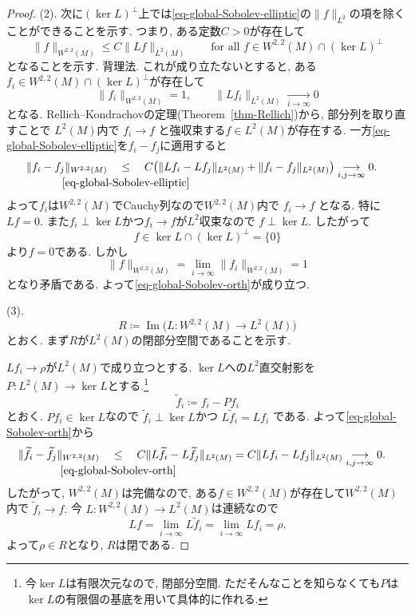 \documentclass[dvipdfmx,a4paper,11pt]{article} %
\theoremstyle{definition}
\theoremstyle{remark}
\numberwithin{equation}{section}
\newcommand{\underalign}[2]{%
  \quad
  \underset{\mathclap{\raisebox{-1.6ex}{\ensuremath{\scriptstyle #1}}}}{#2}
  \quad
}
\begin{document}
\begin{proof}
(2). 次に$(\ker L)^\perp$上では\eqref{eq-global-Sobolev-elliptic}の$\lVert f\rVert_{L^2}$の項を除くことができることを示す. 
つまり, ある定数$C>0$が存在して
\begin{equation}
\label{eq-global-Sobolev-orth}
\lVert f\rVert_{W^{2,2}(M)}
\leq
C\lVert Lf\rVert_{L^2(M)}
\qquad
\text{for all }f\in W^{2,2}(M)\cap(\ker L)^\perp
\end{equation}
となることを示す. 
背理法. これが成り立たないとすると, 
ある$f_i\in W^{2,2}(M)\cap(\ker L)^\perp$が存在して
\[
\lVert f_i\rVert_{W^{2,2}(M)}=1,
\qquad
\lVert Lf_i\rVert_{L^2(M)}
\underset{i\to\infty}{\longrightarrow}0
\]
となる. 
Rellich--Kondrachovの定理(Theorem~\ref{thm-Rellich})から, 部分列を取り直すことで
$L^2(M)$内で
\(
f_i\to f
\)
と強収束する$f\in L^2(M)$が存在する. 
一方\eqref{eq-global-Sobolev-elliptic}を$f_i-f_j$に適用すると
\[
\begin{aligned}
\lVert f_i-f_j\rVert_{W^{2,2}(M)}
&\underalign{\eqref{eq-global-Sobolev-elliptic}}{\leq}
C\bigl(
\lVert Lf_i-Lf_j\rVert_{L^2(M)}
+
\lVert f_i-f_j\rVert_{L^2(M)}
\bigr)
\underset{i,j\to\infty}{\longrightarrow}
0.
\end{aligned}
\]
よって$f_i$は$W^{2,2}(M)$でCauchy列なので$W^{2,2}(M)$内で
\(
f_i\to f
\)
となる. 
特に
\(
Lf=0.
\)
また$f_i\perp\ker L$かつ$f_i\to f$が$L^2$収束なので
\(
f\perp\ker L.
\)
したがって
\[
f\in\ker L\cap(\ker L)^\perp=\{0\}
\]
より$f=0$である. 
しかし
\[
\lVert f\rVert_{W^{2,2}(M)}
=
\lim_{i\to\infty}
\lVert f_i\rVert_{W^{2,2}(M)}
=1
\]
となり矛盾である. 
よって\eqref{eq-global-Sobolev-orth}が成り立つ. 


(3). 
\[
R\coloneqq
\operatorname{Im}
\bigl(
L\colon W^{2,2}(M)\to L^2(M)
\bigr)
\]
とおく. 
まず$R$が$L^2(M)$の閉部分空間であることを示す. 

$Lf_i\to\rho$が$L^2(M)$で成り立つとする. 
$\ker L$への$L^2$直交射影を$P : L^2(M) \to \ker L$とする.\footnote{今$\ker L$は有限次元なので, 閉部分空間. ただそんなことを知らなくても$P$は$\ker L$の有限個の基底を用いて具体的に作れる. }
\[
\widetilde f_i\coloneqq f_i-Pf_i
\]
とおく. 
$Pf_i\in\ker L$なので
\(
\widetilde f_i\perp\ker L\)かつ
\(
L\widetilde f_i=Lf_i
\)
である. 
よって\eqref{eq-global-Sobolev-orth}から
\[
\begin{aligned}
\lVert \widetilde f_i-\widetilde f_j\rVert_{W^{2,2}(M)}
&\underalign{\eqref{eq-global-Sobolev-orth}}{\leq}
C\lVert L\widetilde f_i-L\widetilde f_j\rVert_{L^2(M)}
=
C\lVert Lf_i-Lf_j\rVert_{L^2(M)}
\underset{i,j\to\infty}{\longrightarrow}0.
\end{aligned}
\]
したがって, $W^{2,2}(M)$は完備なので, ある$f\in W^{2,2}(M)$が存在して$W^{2,2}(M)$内で
\(
\widetilde f_i\to f.
\)
今
$L\colon W^{2,2}(M)\to L^2(M)$は連続なので
\[
Lf
=
\lim_{i\to\infty}L\widetilde f_i
=
\lim_{i\to\infty}Lf_i
=
\rho.
\]
よって$\rho\in R$となり, $R$は閉である. 



\end{proof}
\end{document}
